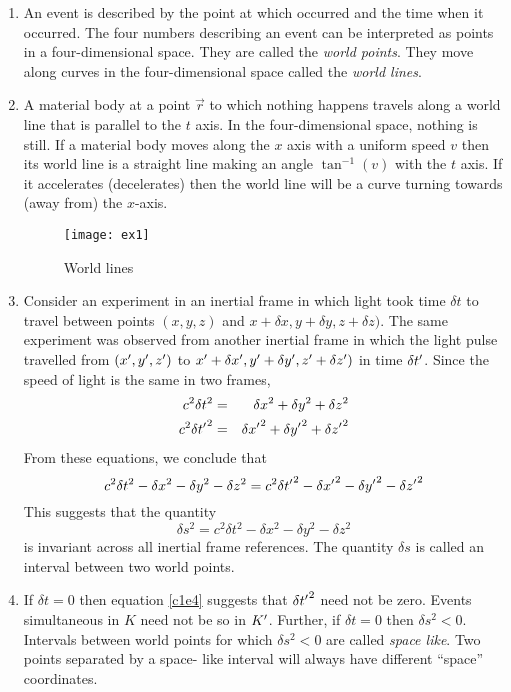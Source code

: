 \begin{enumerate}
\item An event is described by the point at which occurred and the time when it
occurred. The four numbers describing an event can be interpreted as points in a
four-dimensional space. They are called the \emph{world points}. They move along
curves in the four-dimensional space called the \emph{world lines}.

\item A material body at a point $\vec{r}$ to which nothing happens travels along
a world line that is parallel to the $t$ axis. In the four-dimensional space, nothing
is still. If a material body moves along the $x$ axis with a uniform speed $v$ then
its world line is a straight line making an angle $\tan^{-1}(v)$ with the $t$ axis.
If it accelerates (decelerates) then the world line will be a curve turning towards 
(away from) the $x$-axis. 
\begin{figure}
\texttt{[image: ex1]}
\caption{World lines}
\label{c1f1}
\end{figure}

\item Consider an experiment in an inertial frame in which light took time 
$\delta t$ to travel between points $(x, y, z)$ and $x + \delta x, y + 
\delta y, z + \delta z)$. The same experiment was observed from another inertial 
frame in which the light pulse travelled from $(x^\prime, y^\prime, z^\prime)$ to $x^\prime 
+ \delta x^\prime, y^\prime + \delta y^\prime, z^\prime + \delta z^\prime)$ in time $\delta t^\prime$.
Since the speed of light is the same in two frames,
\begin{eqnarray}
c^2\delta t^2 &=& \delta x^2 + \delta y^2 + \delta z^2 \label{c1e2} \\
c^2\delta {t^\prime}^2 &=& \delta {x^\prime}^2 + \delta {y^\prime}^2 + \delta {z^\prime}^2 \label{c1e3}
\end{eqnarray}
From these equations, we conclude that
\begin{equation}\label{c1e4}
c^2\delta t^2 - \delta x^2 - \delta y^2 - \delta z^2 = 
c^2\delta {t^\prime}^2 - \delta {x^\prime}^2 - \delta {y^\prime}^2 - \delta {z^\prime}^2
\end{equation}
This suggests that the quantity 
\begin{equation}\label{c1e5}
\delta s^2 = c^2\delta t^2 - \delta x^2 - \delta y^2 - \delta z^2
\end{equation}
is invariant across all inertial frame references. The quantity $\delta s$ is
called an interval between two world points.

\item If $\delta t = 0$ then equation \eqref{c1e4} suggests that $\delta {t^\prime}^2$
need not be zero. Events simultaneous in $K$ need not be so in $K^\prime$. Further, if
$\delta t = 0$ then $\delta s^2 < 0$. Intervals between world points for which 
$\delta s^2 < 0$ are called \emph{space like}. Two points separated by a space-
like interval will always have different ``space'' coordinates.


\end{enumerate}
